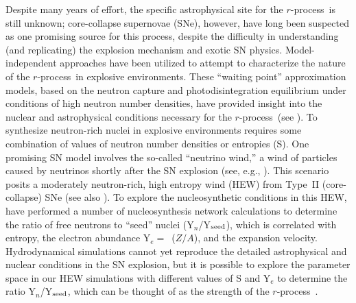 \documentclass{emulateapj}
\def\rpro{\mbox{$r$-process}}
\begin{document}
Despite many years of effort, the specific astrophysical site for the
\rpro\ is still unknown;
core-collapse supernovae (SNe), however, have long been suspected
as one promising source for this process,
despite the difficulty in understanding (and replicating) the
explosion mechanism and exotic SN physics.
Model-independent approaches have been 
utilized to attempt to characterize the nature of the \rpro\
in explosive environments. 
These ``waiting point'' approximation models, 
based on the neutron capture and photodisintegration equilibrium 
under conditions of high neutron number densities, 
have provided insight into the 
nuclear and astrophysical conditions necessary for the \rpro\
(see \citealt{kratz93,kratz07}).
To synthesize neutron-rich nuclei in explosive environments
requires some combination of values of 
neutron number densities or entropies (S). 
One promising SN model involves the so-called ``neutrino wind,''
a wind of particles caused by neutrinos
shortly after the SN explosion
(see, e.g., \citealt{woosley94,thompson03}).
This scenario posits a moderately neutron-rich,   
high entropy wind (HEW) from Type~II (core-collapse) SNe
(see also \citealt{wanajo02}).
To explore the nucleosynthetic conditions in this HEW,
\citet{farouqi09,farouqi10} have performed a number of nucleosynthesis 
network calculations to determine the ratio of
free neutrons to ``seed'' nuclei (Y$_n$/Y$_{\rm seed}$), 
which is correlated with entropy, the electron abundance 
Y$_e =$~($Z/A$), and the expansion velocity. 
Hydrodynamical simulations cannot yet
reproduce the detailed astrophysical and 
nuclear conditions in the SN explosion,
but it is possible to explore the parameter space  
in our HEW simulations with different values of S and Y$_e$
to determine the ratio Y$_n$/Y$_{\rm seed}$,
which can be thought of as the strength of the \rpro\ 
\citep{kratz08b,farouqi09,farouqi10}.
\end{document}
